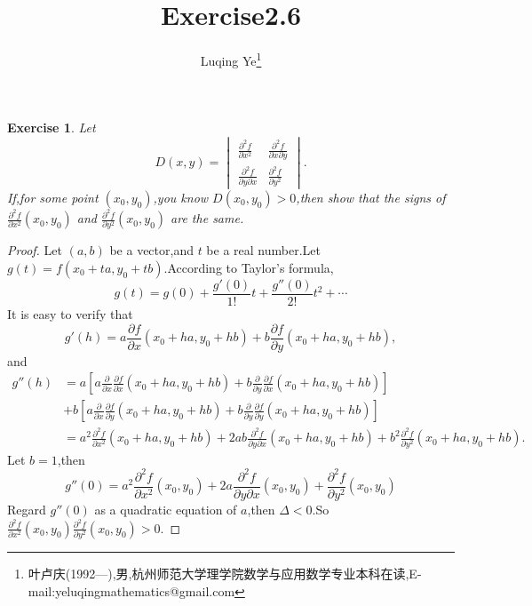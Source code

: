 \documentclass[a4paper]{article}
\newtheorem*{exe}{Exercise}
\newenvironment{exercise}
{\bigskip\begin{mdframed}\begin{exe}}
    {\end{exe}\end{mdframed}\bigskip}
\newcommand{\pa}{\partial} \newcommand{\Om}{\Omega}
\begin{document}
\title{\huge{\bf{Exercise2.6}}} \author{\small{Luqing Ye\footnote{叶卢庆(1992---),男,杭州师范大学理学院数学与应用数学专业本科在读,E-mail:yeluqingmathematics@gmail.com}}}
\maketitle
\begin{exercise}
Let 
$$
D(x,y)=
\begin{vmatrix}
\frac{\pa^2f}{\pa x^2}&\frac{\pa^2f}{\pa x\pa y}\\
\frac{\pa^2f}{\pa y\pa x}& \frac{\pa^2f}{\pa y^2}
\end{vmatrix}.
$$
If,for some point $(x_0,y_0)$,you know $D(x_0,y_0)>0$,then show that
the signs of $\frac{\pa^2f}{\pa x^2}(x_0,y_0)$ and $\frac{\pa^2f}{\pa
  y^2}(x_0,y_0)$ are the same.
\end{exercise}
\begin{proof}
Let $(a,b)$ be a vector,and $t$ be a real number.Let $g(t)=f(x_0+ta,y_0+tb)$.According to Taylor's formula,
$$
g(t)=g(0)+\frac{g'(0)}{1!}t+\frac{g''(0)}{2!}t^2+\cdots
$$
It is easy to verify that 
$$
g'(h)=a\frac{\pa f}{\pa x}(x_0+ha,y_0+hb)+b \frac{\pa f}{\pa y}(x_0+ha,y_0+hb),
$$
and
\begin{align*}
  g''(h)&=a\left[a\frac{\pa }{\pa x}\frac{\pa f}{\pa x}(x_0+ha,y_{0}+hb)+b
  \frac{\pa}{\pa y}\frac{\pa f}{\pa
    x}(x_0+ha,y_{0}+hb)\right]\\&+b\left[a\frac{\pa}{\pa x}\frac{\pa
    f}{\pa y}(x_{0}+ha,y_{0}+hb)+b \frac{\pa}{\pa y} \frac{\pa f}{\pa
    y}(x_{0}+ha,y_{0}+hb)\right]
\\&=a^2 \frac{\pa^2f}{\pa
  x^2}(x_0+ha,y_0+hb)+2ab\frac{\pa^2f}{\pa y\pa
    x}(x_{0}+ha,y_{0}+hb)+b^2 \frac{\pa^2f}{\pa
  y^2}(x_0+ha,y_0+hb).
\end{align*}
Let $b=1$,then
$$
g''(0)=a^2 \frac{\pa^2f}{\pa
  x^2}(x_0,y_0)+2a\frac{\pa^2f}{\pa y\pa
    x}(x_{0},y_{0})+\frac{\pa^2f}{\pa
  y^2}(x_0,y_0)
$$
Regard $g''(0)$ as a quadratic equation of $a$,then $\Delta<0$.So  $\frac{\pa^2f}{\pa
  x^2}(x_0,y_0)\frac{\pa^2f}{\pa
  y^2}(x_0,y_0)>0$.
\end{proof}
\end{document}
